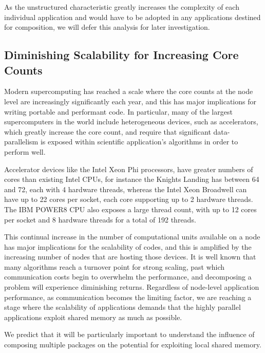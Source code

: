 \documentclass[runningheads,a4paper]{llncs}
\begin{document}
As the unstructured characteristic greatly increases the complexity of each individual application and would have to be adopted in any applications destined for composition, we will defer this analysis for later investigation.

\subsection{Diminishing Scalability for Increasing Core Counts}

\label{sec:scalability-inhibit}

Modern supercomputing has reached a scale where the core counts at the node level are increasingly significantly each year, and this has major implications for writing portable and performant code. In particular, many of the largest supercomputers in the world include heterogeneous devices, such as accelerators, which greatly increase the core count, and require that significant data-parallelism is exposed within scientific application's algorithms in order to perform well.

Accelerator devices like the Intel Xeon Phi processors, have greater numbers of cores than existing Intel CPUs, for instance the Knights Landing has between 64 and 72, each with 4 hardware threads, whereas the Intel Xeon Broadwell can have up to 22 cores per socket, each core supporting up to 2 hardware threads. The IBM POWER8 CPU also exposes a large thread count, with up to 12 cores per socket and 8 hardware threads for a total of 192 threads.

This continual increase in the number of computational units available on a node has major implications for the scalability of codes, and this is amplified by the increasing number of nodes that are hosting those devices. It is well known that many algorithms reach a turnover point for strong scaling, past which communication costs begin to overwhelm the performance, and decomposing a problem will experience diminishing returns. Regardless of node-level application performance, as communication becomes the limiting factor, we are reaching a stage where the scalability of applications demands that the highly parallel applications exploit shared memory as much as possible.

We predict that it will be particularly important to understand the influence of composing multiple packages on the potential for exploiting local shared memory.

\end{document}
